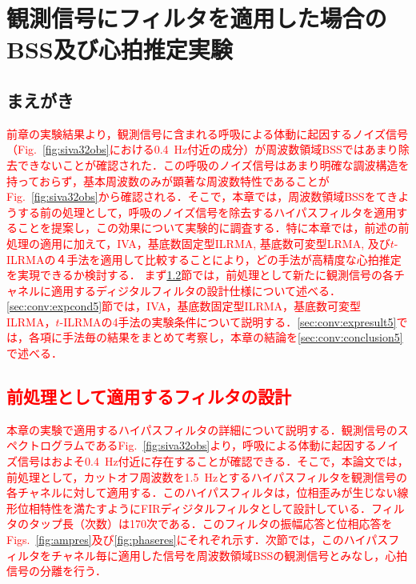 \chapter{観測信号にフィルタを適用した場合のBSS及び心拍推定実験}
\label{chap:fbsshrexp}

\section{まえがき}
\textcolor{red}{前章の実験結果より，観測信号に含まれる呼吸による体動に起因するノイズ信号（Fig.~\ref{fig:siva32obs}における0.4~Hz付近の成分）が周波数領域BSSではあまり除去できないことが確認された．この呼吸のノイズ信号はあまり明確な調波構造を持っておらず，基本周波数のみが顕著な周波数特性であることがFig.~\ref{fig:siva32obs}から確認される．そこで，本章では，周波数領域BSSをてきようする前の処理として，呼吸のノイズ信号を除去するハイパスフィルタを適用することを提案し，この効果について実験的に調査する．特に本章では，前述の前処理の適用に加えて，IVA，基底数固定型ILRMA, 基底数可変型LRMA, 及び$t$-ILRMAの４手法を適用して比較することにより，どの手法が高精度な心拍推定を実現できるか検討する．
まず\ref{sec:conv:filteroutline}節では，前処理として新たに観測信号の各チャネルに適用するディジタルフィルタの設計仕様について述べる．\ref{sec:conv:expcond5}節では，IVA，基底数固定型ILRMA，基底数可変型ILRMA，$t$-ILRMAの4手法の実験条件について説明する．\ref{sec:conv:expresult5}では，各項に手法毎の結果をまとめて考察し，本章の結論を\ref{sec:conv:conclusion5}で述べる．}

\section{\textcolor{red}{前処理として適用するフィルタの設計}}
\label{sec:conv:filteroutline}
\textcolor{red}{本章の実験で適用するハイパスフィルタの詳細について説明する．観測信号のスペクトログラムであるFig.~\ref{fig:siva32obs}より，呼吸による体動に起因するノイズ信号はおよそ0.4~Hz付近に存在することが確認できる．そこで，本論文では，前処理として，カットオフ周波数を1.5~Hzとするハイパスフィルタを観測信号の各チャネルに対して適用する．このハイパスフィルタは，位相歪みが生じない線形位相特性を満たすようにFIRディジタルフィルタとして設計している．フィルタのタップ長（次数）は170次である．このフィルタの振幅応答と位相応答をFigs.~\ref{fig:ampres}及び\ref{fig:phaseres}にそれぞれ示す．次節では，このハイパスフィルタをチャネル毎に適用した信号を周波数領域BSSの観測信号とみなし，心拍信号の分離を行う．}

